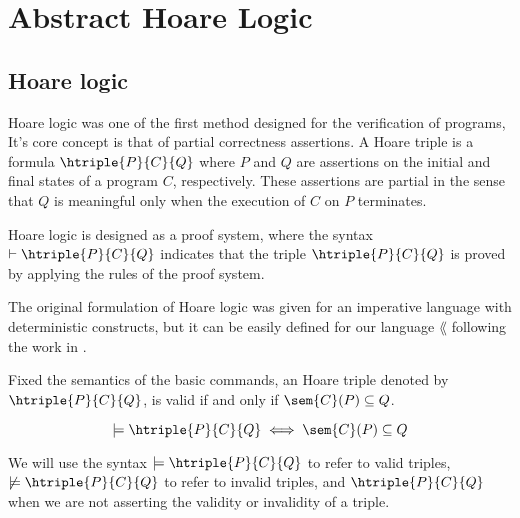 \section{Abstract Hoare Logic}
\label{chp:intro-ahorare}

\subsection{Hoare logic}
Hoare logic  \cite{Hoare69, Floyd93} was one of the first method designed for 
the verification of programs, It's core concept is that of partial correctness 
assertions. A Hoare triple is a formula $\htriple{P}{C}{Q}$ where $P$ and $Q$ are 
assertions on the initial and final states of a program $C$, respectively. 
These assertions are partial in the sense that $Q$ is meaningful only when the 
execution of $C$ on $P$ terminates.

Hoare logic is designed as a proof system, where the syntax 
$\vdash \htriple{P}{C}{Q}$ indicates that the triple 
$\htriple{P}{C}{Q}$ is proved by applying the rules of the proof system.

The original formulation of Hoare logic was given for an imperative language 
with deterministic constructs, but it can be easily defined for our language 
$\lang$ following the work in \cite{Moller21}.

\begin{definition}
  \label{def:hoare}
  Fixed the semantics of the basic commands, an Hoare triple denoted by 
  $\htriple{P}{C}{Q}$, is valid if and only if $\sem{C}(P) \subseteq Q$.

  $$\models \htriple{P}{C}{Q} \iff \sem{C}(P) \subseteq Q$$
\end{definition}

We will use the syntax $\models \htriple{P}{C}{Q}$ to refer to valid triples,
$\not \models \htriple{P}{C}{Q}$ to refer to invalid triples, and
$\htriple{P}{C}{Q}$ when we are not asserting the validity or invalidity of a
triple.

